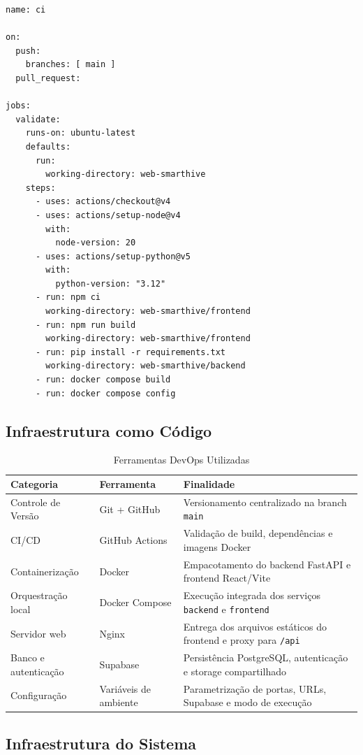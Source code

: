 \begin{verbatim}
name: ci

on:
  push:
    branches: [ main ]
  pull_request:

jobs:
  validate:
    runs-on: ubuntu-latest
    defaults:
      run:
        working-directory: web-smarthive
    steps:
      - uses: actions/checkout@v4
      - uses: actions/setup-node@v4
        with:
          node-version: 20
      - uses: actions/setup-python@v5
        with:
          python-version: "3.12"
      - run: npm ci
        working-directory: web-smarthive/frontend
      - run: npm run build
        working-directory: web-smarthive/frontend
      - run: pip install -r requirements.txt
        working-directory: web-smarthive/backend
      - run: docker compose build
      - run: docker compose config
\end{verbatim}

\subsection{Infraestrutura como Código}

\begin{table}[H]
\centering
\caption{Ferramentas DevOps Utilizadas}
\label{tab:devops-tools}
\begin{tabular}{|l|l|p{6cm}|}
\hline
\textbf{Categoria} & \textbf{Ferramenta} & \textbf{Finalidade} \\
\hline
Controle de Versão & Git + GitHub & Versionamento centralizado na branch \texttt{main} \\
CI/CD & GitHub Actions & Validação de build, dependências e imagens Docker \\
Containerização & Docker & Empacotamento do backend FastAPI e frontend React/Vite \\
Orquestração local & Docker Compose & Execução integrada dos serviços \texttt{backend} e \texttt{frontend} \\
Servidor web & Nginx & Entrega dos arquivos estáticos do frontend e proxy para \texttt{/api} \\
Banco e autenticação & Supabase & Persistência PostgreSQL, autenticação e storage compartilhado \\
Configuração & Variáveis de ambiente & Parametrização de portas, URLs, Supabase e modo de execução \\
\hline
\end{tabular}
\end{table}

\subsection{Infraestrutura do Sistema}

